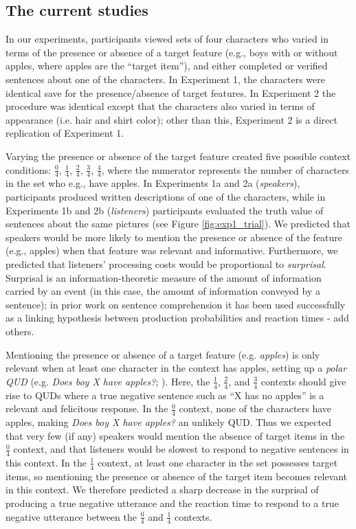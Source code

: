 \documentclass[man, floatsintext, noapacite]{apa6}
\begin{document}
\subsection{The current studies}

In our experiments, participants viewed sets of four characters who varied in terms of the presence or absence of a target feature (e.g., boys with or without apples, where apples are the ``target item''), and either completed or verified sentences about one of the characters. In Experiment 1, the characters were identical save for the presence/absence of target features. In Experiment 2 the procedure was identical except that the characters also varied in terms of appearance (i.e. hair and shirt color); other than this, Experiment 2 is a direct replication of Experiment 1. 

Varying the presence or absence of the target feature created five possible context conditions: $\frac{0}{4}$, $\frac{1}{4}$, $\frac{2}{4}$, $\frac{3}{4}$, $\frac{4}{4}$, where the numerator represents the number of characters in the set who e.g., have apples. In Experiments 1a and 2a (\textit{speakers}), participants produced written descriptions of one of the characters, while in Experiments 1b and 2b (\textit{listeners}) participants evaluated the truth value of sentences about the same pictures (see Figure \ref{fig:exp1_trial}). We predicted that speakers would be more likely to mention the presence or absence of the feature (e.g., apples) when that feature was relevant and informative. Furthermore, we predicted that listeners' processing costs would be proportional to \textit{surprisal}. Surprisal is an information-theoretic measure of the amount of information carried by an event (in this case, the amount of information conveyed by a sentence); in prior work on sentence comprehension it has been used successfully as a linking hypothesis between production probabilities and reaction times \cite{levy2008} - add others. 

Mentioning the presence or absence of a target feature (e.g. \textit{apples}) is only relevant when at least one character in the context has apples, setting up a \textit{polar QUD} (e.g. \textit{Does boy X have apples?}; ). Here, the $\frac{1}{4}$, $\frac{2}{4}$, and $\frac{3}{4}$ contexts should give rise to QUDs where a true negative sentence such as ``X has no apples'' is a relevant and felicitous response. In the $\frac{0}{4}$ context, none of the characters have apples, making \textit{Does boy X have apples?} an unlikely QUD. Thus we expected that very few (if any) speakers would mention the absence of target items in the $\frac{0}{4}$ context, and that listeners would be slowest to respond to negative sentences in this context. In the $\frac{1}{4}$ context, at least one character in the set possesses target items, so mentioning the presence or absence of the target item becomes relevant in this context. We therefore predicted a sharp decrease in the surprisal of producing a true negative utterance and the reaction time to respond to a true negative utterance between the $\frac{0}{4}$ and $\frac{1}{4}$ contexts.
\end{document}
